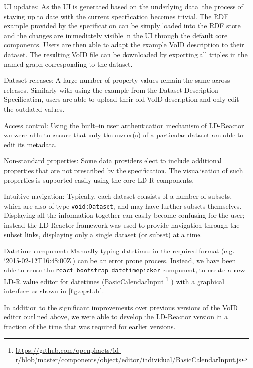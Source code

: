 \documentclass{llncs}
\begin{document}
\begin{compactitem}
	\item UI updates: As the UI is generated based on the underlying data, the process of staying up to date with the current specification becomes trivial. The RDF example provided by the specification can be simply loaded into the RDF store and the changes are immediately visible in the UI through the default core components. Users are then able to adapt the example VoID description to their dataset. The resulting VoID file can be downloaded by exporting all triples in the named graph corresponding to the dataset.
	\item Dataset releases: A large number of property values remain the same across releases. Similarly with using the example from the Dataset Description Specification, users are able to upload their old VoID description and only edit the outdated values.
	\item Access control: Using the built--in user authentication mechanism of LD-Reactor we were able to ensure that only the owner(s) of a particular dataset are able to edit its metadata.
	\item Non-standard properties: Some data providers elect to include additional properties that are not prescribed by the specification. The visualisation of such properties is supported easily using the core LD-R components.
	\item Intuitive navigation: Typically, each dataset consists of a number of subsets, which are also of type \texttt{void:Dataset}, and may have further subsets themselves. Displaying all the information together can easily become confusing for the user; instead the LD-Reactor framework was used to provide navigation through the subset links, displaying only a single dataset (or subset) at a time.
	\item Datetime component: Manually typing datetimes in the required format (e.g. `2015-02-12T16:48:00Z') can be an error prone process. Instead, we have been able to reuse the \texttt{react-bootstrap-datetimepicker} component, to create a new LD-R value editor for datetimes (BasicCalendarInput
\footnote{\url{https://github.com/openphacts/ld-r/blob/master/components/object/editor/individual/BasicCalendarInput.js}}
) with a graphical interface as shown in \autoref{fig:opsLdr}.
\end{compactitem}

In addition to the significant improvements over previous versions of the VoID editor outlined above, we were able to develop the LD-Reactor version in a fraction of the time that was required for earlier versions.
\end{document}
